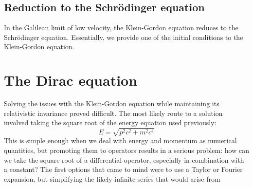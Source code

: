 \subsection{Reduction to the Schrödinger equation}

In the Galilean limit of low velocity, the Klein-Gordon equation reduces to the Schrödinger
equation. Essentially, we provide one of the initial conditions to the Klein-Gordon equation.

\section{The Dirac equation}

Solving the issues with the Klein-Gordon equation while maintaining its relativistic invariance
proved difficult. The most likely route to a solution involved taking the square root of the
energy equation used previously:
\begin{equation}
E = \sqrt{p^2 c^2 + m^2 c^4}
\end{equation}
This is simple enough when we deal with energy and momentum as numerical quantities, but promoting
them to operators results in a serious problem: how can we take the square root of a differential
operator, especially in combination with a constant? The first options that came to mind were
to use a Taylor or Fourier expansion, but simplifying the likely infinite series that would arise
from 

